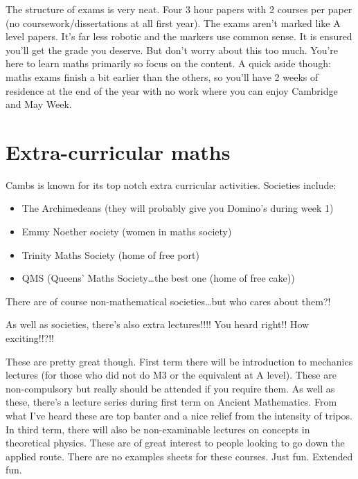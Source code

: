 \documentclass[a4paper,11pt]{article}
\begin{document}
The structure of exams is very neat. Four 3 hour papers with 2 courses per paper (no coursework/dissertations at all first year). The exams aren't marked like A level papers. It's far less robotic and the markers use common sense. It is ensured you'll get the grade you deserve. But don't worry about this too much. You're here to learn maths primarily so focus on the content. A quick aside though: maths exams finish a bit earlier than the others, so you'll have 2 weeks of residence at the end of the year with no work where you can enjoy Cambridge and May Week.

\section{Extra-curricular maths}

Cambs is known for its top notch extra curricular activities. Societies include:
\begin{itemize}
    \item The Archimedeans (they will probably give you Domino's during week 1)
    \item Emmy Noether society (women in maths society)
    \item Trinity Maths Society (home of free port)
    \item QMS (Queens' Maths Society\dots  the best one (home of free cake))
\end{itemize}
There are of course non-mathematical societies\dots but who cares about them?!

As well as societies, there's also extra lectures!!!! You heard right!! How exciting!!?!!

These are pretty great though. First term there will be introduction to mechanics lectures (for those who did not do M3 or the equivalent at A level). These are non-compulsory but really should be attended if you require them. As well as these, there's a lecture series during first term on Ancient Mathematics. From what I've heard these are top banter and a nice relief from the intensity of tripos. In third term, there will also be non-examinable lectures on concepts in theoretical physics. These are of great interest to people looking to go down the applied route. There are no examples sheets for these courses. Just fun. Extended fun.
\end{document}
